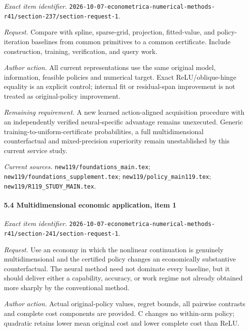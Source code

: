\emph{Exact item identifier.} \nolinkurl{2026-10-07-econometrica-numerical-methods-r41/section-237/section-request-1}.

\par\emph{Request.} Compare with spline, sparse-grid, projection, fitted-value, and policy-iteration baselines from common primitives to a common certificate. Include construction, training, verification, and query work.

\par\emph{Author action.} All current representations use the same original model, information, feasible policies and numerical target. Exact ReLU/\allowbreak{}oblique-hinge equality is an explicit control; internal fit or residual-span improvement is not treated as original-policy improvement.

\par\emph{Remaining requirement.} A new learned action-aligned acquisition procedure with an independently verified neural-specific advantage remains unexecuted. Generic training-to-uniform-certificate probabilities, a full multidimensional counterfactual and mixed-precision superiority remain unestablished by this current service study.

\par\emph{Current sources.} \nolinkurl{new119/foundations_main.tex}; \nolinkurl{new119/foundations_supplement.tex}; \nolinkurl{new119/policy_main119.tex}; \nolinkurl{new119/R119_STUDY_MAIN.tex}.

\paragraph{5.4 Multidimensional economic application, item 1}

\emph{Exact item identifier.} \nolinkurl{2026-10-07-econometrica-numerical-methods-r41/section-241/section-request-1}.

\par\emph{Request.} Use an economy in which the nonlinear continuation is genuinely multidimensional and the certified policy changes an economically substantive counterfactual. The neural method need not dominate every baseline, but it should deliver either a capability, accuracy, or work regime not already obtained more sharply by the conventional method.

\par\emph{Author action.} Actual original-policy values, regret bounds, all pairwise contrasts and complete cost components are provided. C changes no within-arm policy; quadratic retains lower mean original cost and lower complete cost than ReLU.

